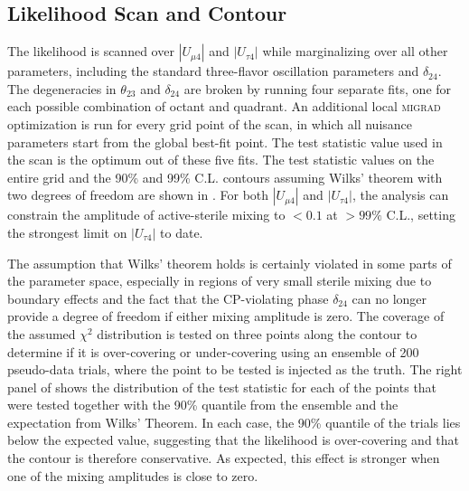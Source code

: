 \subsection{Likelihood Scan and Contour}
The likelihood is scanned over $|U_{\mu 4}|$ and $|U_{\tau 4}|$ while marginalizing over all other parameters, including the standard three-flavor oscillation parameters and $\delta_{24}$. The degeneracies in $\theta_{23}$ and $\delta_{24}$ are broken by running four separate fits, one for each possible combination of octant and quadrant. An additional local \textsc{migrad} optimization is run for every grid point of the scan, in which all nuisance parameters start from the global best-fit point. The test statistic value used in the scan is the optimum out of these five fits. The test statistic values on the entire grid and the 90\% and 99\% C.L. contours assuming Wilks' theorem with two degrees of freedom are shown in . For both $|U_{\mu 4}|$ and $|U_{\tau 4}|$, the analysis can constrain the amplitude of active-sterile mixing to $<0.1$ at $>99\%$ C.L., setting the strongest limit on $|U_{\tau 4}|$ to date.

The assumption that Wilks' theorem holds is certainly violated in some parts of the parameter space, especially in regions of very small sterile mixing due to boundary effects and the fact that the CP-violating phase $\delta_{24}$ can no longer provide a degree of freedom if either mixing amplitude is zero. The coverage of the assumed $\chi^2$ distribution is tested on three points along the contour to determine if it is over-covering or under-covering using an ensemble of 200 pseudo-data trials, where the point to be tested is injected as the truth. The right panel of  shows the distribution of the test statistic for each of the points that were tested together with the 90\% quantile from the ensemble and the expectation from Wilks' Theorem. In each case, the 90\% quantile of the trials lies below the expected value, suggesting that the likelihood is over-covering and that the contour is therefore conservative. As expected, this effect is stronger when one of the mixing amplitudes is close to zero.

%     


